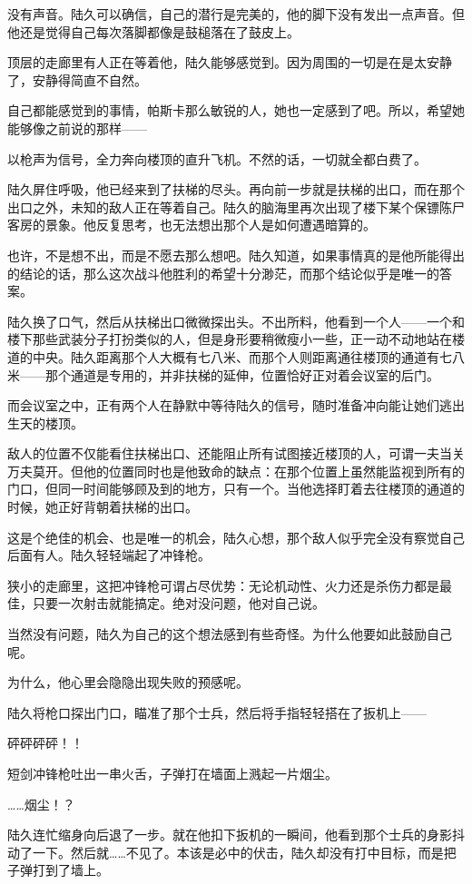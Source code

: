 没有声音。陆久可以确信，自己的潜行是完美的，他的脚下没有发出一点声音。但他还是觉得自己每次落脚都像是鼓槌落在了鼓皮上。

顶层的走廊里有人正在等着他，陆久能够感觉到。因为周围的一切是在是太安静了，安静得简直不自然。

自己都能感觉到的事情，帕斯卡那么敏锐的人，她也一定感到了吧。所以，希望她能够像之前说的那样——

以枪声为信号，全力奔向楼顶的直升飞机。不然的话，一切就全都白费了。

陆久屏住呼吸，他已经来到了扶梯的尽头。再向前一步就是扶梯的出口，而在那个出口之外，未知的敌人正在等着自己。陆久的脑海里再次出现了楼下某个保镖陈尸客房的景象。他反复思考，也无法想出那个人是如何遭遇暗算的。

也许，不是想不出，而是不愿去那么想吧。陆久知道，如果事情真的是他所能得出的结论的话，那么这次战斗他胜利的希望十分渺茫，而那个结论似乎是唯一的答案。

陆久换了口气，然后从扶梯出口微微探出头。不出所料，他看到一个人——一个和楼下那些武装分子打扮类似的人，但是身形要稍微瘦小一些，正一动不动地站在楼道的中央。陆久距离那个人大概有七八米、而那个人则距离通往楼顶的通道有七八米——那个通道是专用的，并非扶梯的延伸，位置恰好正对着会议室的后门。

而会议室之中，正有两个人在静默中等待陆久的信号，随时准备冲向能让她们逃出生天的楼顶。

敌人的位置不仅能看住扶梯出口、还能阻止所有试图接近楼顶的人，可谓一夫当关万夫莫开。但他的位置同时也是他致命的缺点：在那个位置上虽然能监视到所有的门口，但同一时间能够顾及到的地方，只有一个。当他选择盯着去往楼顶的通道的时候，她正好背朝着扶梯的出口。

这是个绝佳的机会、也是唯一的机会，陆久心想，那个敌人似乎完全没有察觉自己后面有人。陆久轻轻端起了冲锋枪。

狭小的走廊里，这把冲锋枪可谓占尽优势：无论机动性、火力还是杀伤力都是最佳，只要一次射击就能搞定。绝对没问题，他对自己说。

当然没有问题，陆久为自己的这个想法感到有些奇怪。为什么他要如此鼓励自己呢。

为什么，他心里会隐隐出现失败的预感呢。

陆久将枪口探出门口，瞄准了那个士兵，然后将手指轻轻搭在了扳机上——

砰砰砰砰！！

短剑冲锋枪吐出一串火舌，子弹打在墙面上溅起一片烟尘。

……烟尘！？

陆久连忙缩身向后退了一步。就在他扣下扳机的一瞬间，他看到那个士兵的身影抖动了一下。然后就……不见了。本该是必中的伏击，陆久却没有打中目标，而是把子弹打到了墙上。

